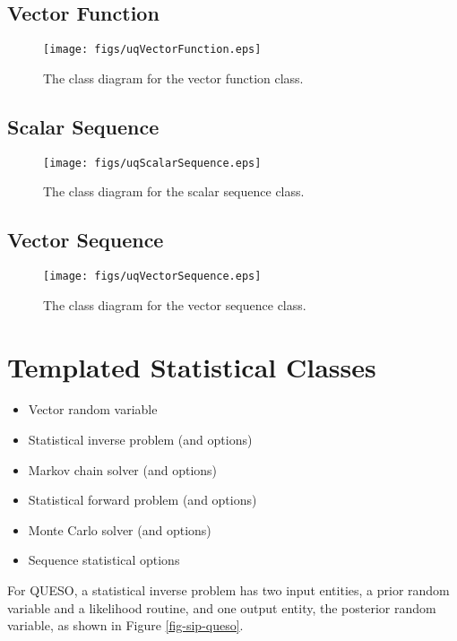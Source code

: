 \clearpage
\subsection{Vector Function}

\begin{figure}[h!]
\centerline{
\texttt{[image: figs/uqVectorFunction.eps]}
}
\caption{
The class diagram for the vector function class.
}
\label{fig-vector-function-class}
\end{figure}

\clearpage
\subsection{Scalar Sequence}

\begin{figure}[h!]
\centerline{
\texttt{[image: figs/uqScalarSequence.eps]}
}
\caption{
The class diagram for the scalar sequence class.
}
\label{fig-scalar-sequence-class}
\end{figure}

\clearpage
\subsection{Vector Sequence}

\begin{figure}[h!]
\centerline{
\texttt{[image: figs/uqVectorSequence.eps]}
}
\caption{
The class diagram for the vector sequence class.
}
\label{fig-vector-sequence-class}
\end{figure}

\clearpage
\section{Templated Statistical Classes}

\begin{itemize}
\item Vector random variable
\item Statistical inverse problem (and options)
\item Markov chain solver (and options)
\item Statistical forward problem (and options)
\item Monte Carlo solver (and options)
\item Sequence statistical options
\end{itemize}

For QUESO, a statistical inverse problem has two input entities, a prior random variable and
a likelihood routine, and one output entity, the posterior random variable, as shown in Figure \ref{fig-sip-queso}.

